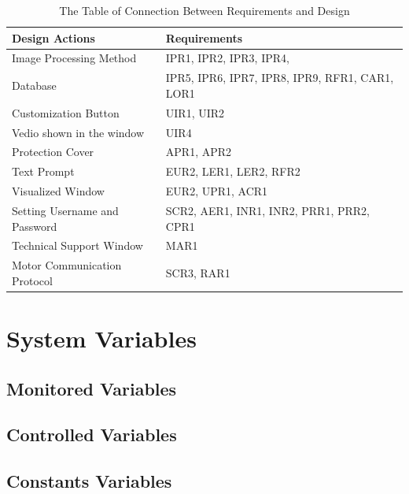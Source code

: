 \documentclass[12pt, titlepage]{article}
\begin{document}
\begin{table}[H]
\begin{center}
\caption {The Table of Connection Between Requirements and Design}
    \begin{tabular}{| p{8cm}| p{7cm} |}
    \hline
    \textbf{Design Actions} & \textbf{Requirements}  \\
    \hline
    Image Processing Method & IPR1, IPR2, IPR3, IPR4,  \\
    \hline
    Database  & IPR5, IPR6, IPR7, IPR8, IPR9, RFR1, CAR1, LOR1\\
    \hline
    Customization Button & UIR1, UIR2\\
    \hline
    Vedio shown in the window & UIR4\\
    \hline
    Protection Cover & APR1, APR2 \\
    \hline
    Text Prompt & EUR2, LER1, LER2, RFR2\\
    \hline
    Visualized Window & EUR2, UPR1, ACR1\\
    \hline
    Setting Username and Password & SCR2, AER1, INR1, INR2, PRR1, PRR2, CPR1\\
    \hline
    Technical Support Window & MAR1\\
    \hline
    Motor Communication Protocol & SCR3, RAR1\\
    \hline
    \end{tabular}
\end{center}
\end{table}

\section{System Variables}


\subsection{Monitored Variables}

\subsection{Controlled Variables}

\subsection{Constants Variables}
\end{document}
